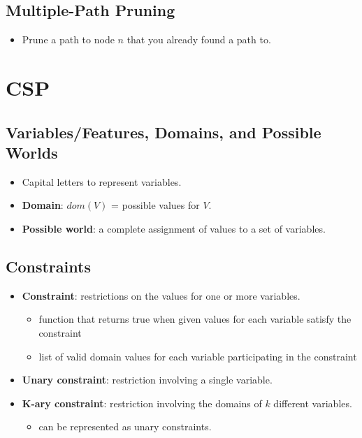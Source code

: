 \documentclass{article}
\begin{document}
\subsection{Multiple-Path Pruning}

\begin{itemize}
    \item Prune a path to node $n$ that you already found a path to.
\end{itemize}

\section{CSP}

\subsection{Variables/Features, Domains, and Possible Worlds}

\begin{itemize}
    \item Capital letters to represent variables.
    \item \textbf{Domain}: $dom(V)$ = possible values for $V$.
    \item \textbf{Possible world}: a complete assignment of values to a set of variables.
\end{itemize}

\subsection{Constraints}

\begin{itemize}
    \item \textbf{Constraint}: restrictions on the values for one or more variables.
        \begin{itemize}
            \item function that returns true when given values for each variable satisfy the constraint
            \item list of valid domain values for each variable participating in the constraint
        \end{itemize}
    \item \textbf{Unary constraint}: restriction involving a single variable.
    \item \textbf{K-ary constraint}: restriction involving the domains of $k$ different variables.
        \begin{itemize}
            \item can be represented as unary constraints.
        \end{itemize}
\end{itemize}
\end{document}

